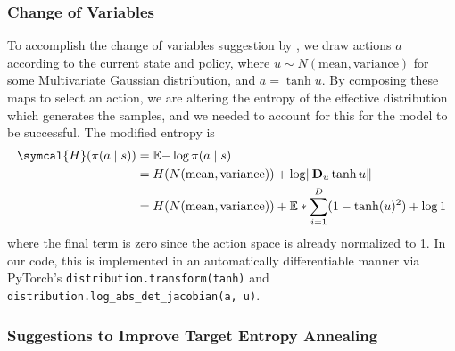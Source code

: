 \documentclass[base]{subfiles}
\begin{document}
\subsubsection{Change of Variables}
To accomplish the change of variables suggestion by \cite{sac}, we draw actions \(a\) according to the current state and policy, where \(u \sim N(\text{mean}, \text{variance})\) for some Multivariate Gaussian distribution, and
\(a = \tanh u\).
By composing these maps to select an action, we are altering the entropy of the effective distribution which generates the samples, and we needed to account for this for the model to be successful.
The modified entropy is
\begin{align*}
	\symcal{H} (\pi(a \mid s)) & = \mathbb{E}{- \log \pi (a \mid s)}                                                            \\
	                           & = H (N(\text{mean}, \text{variance})) + \log \norm{\mathbf{D}_u \tanh u}                       \\
	                           & = H (N(\text{mean}, \text{variance})) +  \mathbb{E}*{\sum_{i = 1}^D (1 - \tanh(u)^2)} + \log 1
\end{align*}
where the final term is zero since the action space is already normalized to 1.
In our code, this is implemented in an automatically differentiable manner via PyTorch's \verb|distribution.transform(tanh)| and \verb|distribution.log_abs_det_jacobian(a, u)|.


\subsubsection{Suggestions to Improve Target Entropy Annealing}
\end{document}
